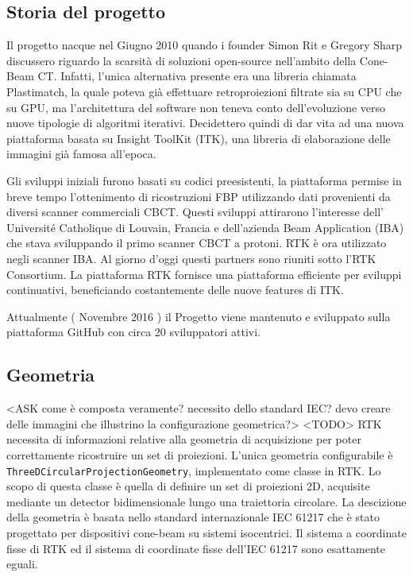 \documentclass[a4paper,12pt, doubleside]{report}
\begin{document}
            \subsection{Storia del progetto}
                \par 
                    Il progetto nacque nel Giugno 2010 quando i founder Simon Rit e Gregory Sharp discussero riguardo la scarsità di soluzioni open-source nell'ambito della Cone-Beam CT. Infatti, l'unica alternativa presente era una libreria chiamata Plastimatch, la quale poteva già effettuare retroproiezioni filtrate sia su CPU che su GPU, ma l'architettura del software non teneva conto dell'evoluzione verso nuove tipologie di algoritmi iterativi. Decidettero quindi di dar vita ad una nuova piattaforma basata su Insight ToolKit (ITK), una libreria di elaborazione delle immagini già famosa all'epoca.
                \par
                    Gli sviluppi iniziali furono basati su codici preesistenti, la piattaforma permise in breve tempo l'ottenimento di ricostruzioni FBP utilizzando dati provenienti da diversi scanner commerciali CBCT. Questi sviluppi attirarono l'interesse dell' Université Catholique di Louvain, Francia e dell'azienda Beam Application (IBA) che stava sviluppando il primo scanner CBCT a protoni. RTK è ora utilizzato negli scanner IBA. Al giorno d'oggi questi partners sono riuniti sotto l'RTK Consortium. La piattaforma RTK fornisce una piattaforma efficiente per sviluppi continuativi, beneficiando costantemente delle nuove features di ITK.
                \par
                
                    Attualmente ( Novembre 2016 ) il Progetto viene mantenuto e sviluppato sulla piattaforma GitHub con circa 20 sviluppatori attivi.
                
                
            \subsection{Geometria}
                \par
                    <ASK come è composta veramente? necessito dello standard IEC? devo creare delle immagini che illustrino la configurazione geometrica?> <TODO>
                    RTK necessita di informazioni relative alla geometria di acquisizione per poter correttamente ricostruire un set di proiezioni. L'unica geometria configurabile è \texttt{ ThreeDCircularProjectionGeometry}, implementato come classe in RTK.
                    Lo scopo di questa classe è quella di definire un set di proiezioni 2D, acquisite mediante un detector bidimensionale lungo una traiettoria circolare. La descizione della geometria è basata nello standard internazionale IEC 61217 che è stato progettato per dispositivi cone-beam su sistemi isocentrici. Il sistema a coordinate fisse di RTK ed il sistema di coordinate fisse dell'IEC 61217 sono esattamente eguali. 
                    
\end{document}
